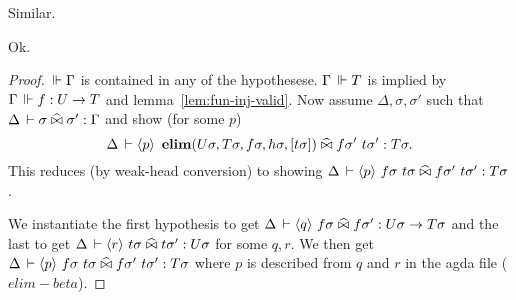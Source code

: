 \documentclass[a4paper,english]{lipics-utf8x}
\begin{document}
  \begin{lemma}
    \leavevmode
    \begin{mathc}
    \end{mathc}
  \end{lemma}
  Similar.

  \begin{lemma}
    \leavevmode
    \begin{mathc}
    \end{mathc}
  \end{lemma}
  Ok.

  \begin{lemma}
    \leavevmode
    \begin{mathc}
    \end{mathc}
  \end{lemma}

  \begin{proof}
    $\,\Vdash \Gamma$ is contained in any of the hypothesese.
    $\Gamma \,\Vdash T$ is implied by $\Gamma \,\Vdash f : U \to T$ and
    lemma~\ref{lem:fun-inj-valid}.
    Now assume $\Delta, \sigma, \sigma'$ such that
    $\Delta \,\vdash \sigma \mathrel{\widehat{\bowtie}} \sigma' : \Gamma$ and
    show (for some $p$)
    \[\Delta \,\vdash \langle p \rangle~
    \operatorname{\mathbf{elim}}(U \sigma,T \sigma,f \sigma,h \sigma,[t \sigma]) \mathrel{\widehat{\bowtie}}
    f \sigma'\ t \sigma' : T \sigma.\]
    This reduces (by weak-head conversion) to showing
    $\Delta \,\vdash \langle p \rangle~
    f \sigma\ t \sigma \mathrel{\widehat{\bowtie}}
    f \sigma'\ t \sigma' : T \sigma$.

    We instantiate the first hypothesis to get
    $\Delta \,\vdash \langle q \rangle~ f \sigma \mathrel{\widehat{\bowtie}} f \sigma' : U \sigma \to T \sigma$
    and the last to get
    $\Delta \,\vdash \langle r \rangle~ t \sigma \mathrel{\widehat{\bowtie}} t \sigma' : U \sigma$
    for some $q,r$.
    We then get
    $\Delta \,\vdash \langle p \rangle~ f \sigma\ t \sigma \mathrel{\widehat{\bowtie}}
    f \sigma'\ t \sigma' : T \sigma$
    where $p$ is described from $q$ and $r$ in the agda file ($elim-beta$).
  \end{proof}

  \begin{lemma}
    \leavevmode
    \begin{mathc}
    \end{mathc}
  \end{lemma}
\end{document}

